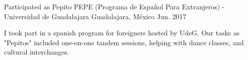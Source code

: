 \begin{cventries}
  \cventry
    {Participated as Pepito}
    {PEPE (Programa de Español Para Extranjeros) - Universidad de Guadalajara}
    {Guadalajara, México}
    {Jun. 2017}
    {
      \begin{cvitems}
        \item {I took part in a spanish program for foreigners hosted by UdeG. Our tasks as "Pepitos" included one-on-one tandem sessions, helping with dance classes, and cultural interchanges.}
      \end{cvitems}
    }
\end{cventries}

